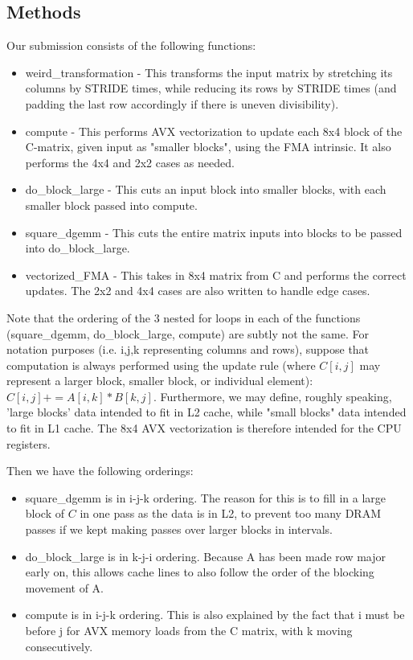 \documentclass[12pt]{article}
\begin{document}
\subsection{Methods}
Our submission consists of the following functions:
\begin{itemize}
\item weird\_transformation - This transforms the input matrix by stretching its columns by STRIDE times, while reducing its rows by STRIDE times (and padding the last row accordingly if there is uneven divisibility).
\item compute - This performs AVX vectorization to update each 8x4 block of the C-matrix, given input as "smaller blocks", using the FMA intrinsic. It also performs the 4x4 and 2x2 cases as needed. 
\item do\_block\_large - This cuts an input block into smaller blocks, with each smaller block passed into compute. 
\item square\_dgemm - This cuts the entire matrix inputs into blocks to be passed into do\_block\_large. 
\item vectorized\_FMA - This takes in 8x4 matrix from C and performs the correct updates. The 2x2 and 4x4 cases are also written to handle edge cases. 
\end{itemize}
Note that the ordering of the 3 nested for loops in each of the functions (square\_dgemm, do\_block\_large, compute) are subtly not the same. For notation purposes (i.e. i,j,k representing columns and rows), suppose that computation is always performed using the update rule (where $C[i,j]$ may represent a larger block, smaller block, or individual element): $C[i,j] += A[i, k]*B[k, j]$. Furthermore, we may define, roughly speaking, 'large blocks' data intended to fit in L2 cache, while "small blocks" data intended to fit in L1 cache. The 8x4 AVX vectorization is therefore intended for the CPU registers. 

Then we have the following orderings: 
\begin{itemize}
\item square\_dgemm is in i-j-k ordering. The reason for this is to fill in a large block of $C$ in one pass as the data is in L2, to prevent too many DRAM passes if we kept making passes over larger blocks in intervals.  
\item do\_block\_large is in k-j-i ordering. Because A has been made row major early on, this allows cache lines to also follow the order of the blocking movement of A. 
\item compute is in i-j-k ordering. This is also explained by the fact that i must be before j for AVX memory loads from the C matrix, with k moving consecutively. 
\end{itemize}
\end{document}
